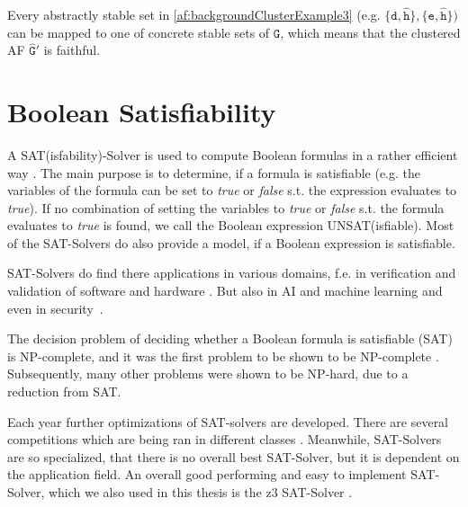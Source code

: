 Every abstractly stable set in \cref{af:backgroundClusterExample3} (e.g. $\mathtt{\{d, \hat{h}\}, \{e, \hat{h}\}})$ can be mapped to one of concrete stable sets of $\mathtt{G}$, which means that the clustered AF $\mathtt{\hat{G}'}$ is faithful.


\section{Boolean Satisfiability}
\label{sec:BooleanSatisfiability}

A SAT(isfability)-Solver is used to compute Boolean formulas in a rather efficient way \cite{Biere2009}. The main purpose is to determine, if a formula is satisfiable (e.g. the variables of the formula can be set to \textit{true} or \textit{false} s.t. the expression evaluates to \textit{true}). If no combination of setting the variables to \textit{true} or \textit{false} s.t. the formula evaluates to \textit{true} is found, we call the Boolean expression UNSAT(isfiable). Most of the SAT-Solvers do also provide a model, if a Boolean expression is satisfiable.

SAT-Solvers do find there applications in various domains, f.e. in verification and validation of software and hardware \cite{DBLP:conf/dagstuhl/Gogolla09, DBLP:books/daglib/0045943}. But also in AI and machine learning \cite{DBLP:phd/basesearch/Liang18a} and even in security~\cite{Pasero2022-SATHashFunctions-Repo, DBLP:journals/iacr/LinYXTS24}.

The decision problem of deciding whether a Boolean formula is satisfiable (SAT) is NP-complete, and it was the first problem to be shown to be NP-complete \cite{Cook71}. Subsequently, many other problems were shown to be NP-hard, due to a reduction from SAT.


Each year further optimizations of SAT-solvers are developed. There are several competitions which are being ran in different classes \cite{SAT-Solver-Competition}. Meanwhile, SAT-Solvers are so specialized, that there is no overall best SAT-Solver, but it is dependent on the application field. An overall good performing and easy to implement SAT-Solver, which we also used in this thesis is the z3 SAT-Solver \cite{z3-SAT-Solver}.



